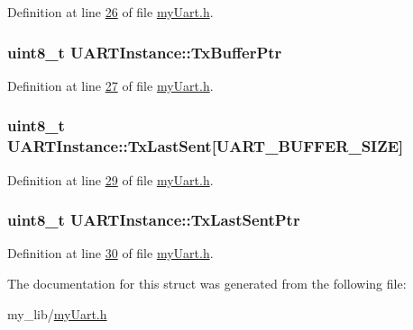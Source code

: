 Definition at line \hyperlink{my_uart_8h_source_l00026}{26} of file \hyperlink{my_uart_8h_source}{my\-Uart.\-h}.

\hypertarget{struct_u_a_r_t_instance_ada90140ddc0177a452e32c0a1268f0fe}{
\subsubsection[{Tx\-Buffer\-Ptr}]{\setlength{\rightskip}{0pt plus 5cm}uint8\-\_\-t U\-A\-R\-T\-Instance\-::\-Tx\-Buffer\-Ptr}}\label{struct_u_a_r_t_instance_ada90140ddc0177a452e32c0a1268f0fe}


Definition at line \hyperlink{my_uart_8h_source_l00027}{27} of file \hyperlink{my_uart_8h_source}{my\-Uart.\-h}.

\hypertarget{struct_u_a_r_t_instance_ac79c2c5b8bc7ae929e76b44e9b0d71a8}{
\subsubsection[{Tx\-Last\-Sent}]{\setlength{\rightskip}{0pt plus 5cm}uint8\-\_\-t U\-A\-R\-T\-Instance\-::\-Tx\-Last\-Sent\mbox{[}{\bf U\-A\-R\-T\-\_\-\-B\-U\-F\-F\-E\-R\-\_\-\-S\-I\-Z\-E}\mbox{]}}}\label{struct_u_a_r_t_instance_ac79c2c5b8bc7ae929e76b44e9b0d71a8}


Definition at line \hyperlink{my_uart_8h_source_l00029}{29} of file \hyperlink{my_uart_8h_source}{my\-Uart.\-h}.

\hypertarget{struct_u_a_r_t_instance_a61c194974dc7b5951c59543ecbf6c651}{
\subsubsection[{Tx\-Last\-Sent\-Ptr}]{\setlength{\rightskip}{0pt plus 5cm}uint8\-\_\-t U\-A\-R\-T\-Instance\-::\-Tx\-Last\-Sent\-Ptr}}\label{struct_u_a_r_t_instance_a61c194974dc7b5951c59543ecbf6c651}


Definition at line \hyperlink{my_uart_8h_source_l00030}{30} of file \hyperlink{my_uart_8h_source}{my\-Uart.\-h}.



The documentation for this struct was generated from the following file\-:\begin{DoxyCompactItemize}
\item 
my\-\_\-lib/\hyperlink{my_uart_8h}{my\-Uart.\-h}\end{DoxyCompactItemize}
